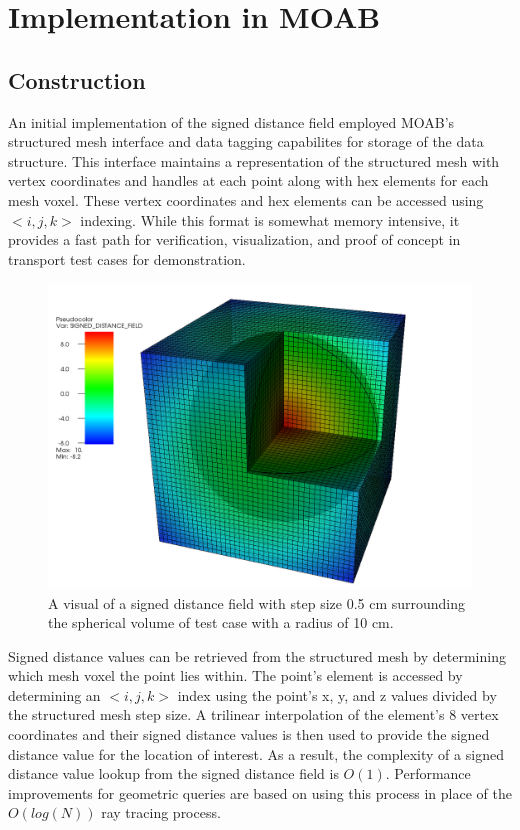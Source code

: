 \section{Implementation in MOAB}

\subsection{Construction}

An initial implementation of the signed distance field employed MOAB's
structured mesh interface and data tagging capabilites for storage of the data
structure. This interface maintains a representation of the structured mesh with
vertex coordinates and handles at each point along with hex elements for each
mesh voxel. These vertex coordinates and hex elements can be accessed using
$<i,j,k>$ indexing. While this format is somewhat memory intensive, it provides
a fast path for verification, visualization, and proof of concept in transport
test cases for demonstration.

\begin{figure}
  \includegraphics[scale=0.22]{../images/sdf_sphere.png}
  \caption{A visual of a signed distance field with step size 0.5 cm surrounding
    the spherical volume of test case with a radius of 10 cm.}
  \label{fig:sdf_sphere}
\end{figure}

Signed distance values can be retrieved from the structured mesh by determining
which mesh voxel the point lies within. The point's element is accessed by
determining an $<i,j,k>$ index using the point's x, y, and z values divided by
the structured mesh step size. A trilinear interpolation of the element's 8 vertex
coordinates and their signed distance values is then used to provide the signed
distance value for the location of interest. As a result, the complexity of a
signed distance value lookup from the signed distance field is
$O(1)$. Performance improvements for geometric queries are based on using this
process in place of the $O(log(N))$ ray tracing process.

